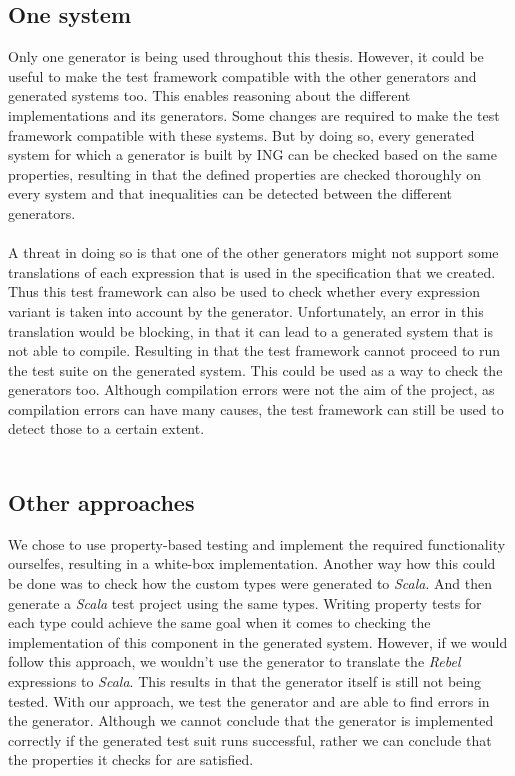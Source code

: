 \subsection*{One system}
Only one generator is being used throughout this thesis. However, it could be useful to make the test framework compatible with the other generators and generated systems too. This enables reasoning about the different implementations and its generators. Some changes are required to make the test framework compatible with these systems. But by doing so, every generated system for which a generator is built by ING can be checked based on the same properties, resulting in that the defined properties are checked thoroughly on every system and that inequalities can be detected between the different generators.\\
\\
A threat in doing so is that one of the other generators might not support some translations of each expression that is used in the specification that we created. Thus this test framework can also be used to check whether every expression variant is taken into account by the generator. Unfortunately, an error in this translation would be blocking, in that it can lead to a generated system that is not able to compile. Resulting in that the test framework cannot proceed to run the test suite on the generated system. This could be used as a way to check the generators too. Although compilation errors were not the aim of the project, as compilation errors can have many causes, the test framework can still be used to detect those to a certain extent.\\
\\
\subsection*{Other approaches}
We chose to use property-based testing and implement the required functionality ourselfes, resulting in a white-box implementation. Another way how this could be done was to check how the custom types were generated to \textit{Scala}. And then generate a \textit{Scala} test project using the same types. Writing property tests for each type could achieve the same goal when it comes to checking the implementation of this component in the generated system. However, if we would follow this approach, we wouldn't use the generator to translate the \textit{Rebel} expressions to \textit{Scala}. This results in that the generator itself is still not being tested. With our approach, we test the generator and are able to find errors in the generator. Although we cannot conclude that the generator is implemented correctly if the generated test suit runs successful, rather we can conclude that the properties it checks for are satisfied.
